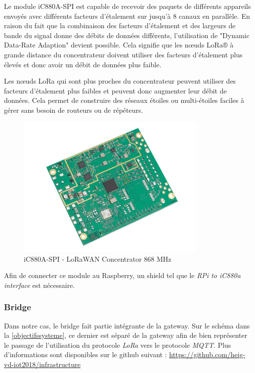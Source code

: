 \documentclass[12pt]{article}
\begin{document}
\newpage
Le module iC880A-SPI est capable de recevoir des paquets de différents appareils envoyés avec différents facteurs d'étalement sur jusqu'à 8 canaux en parallèle. En raison du fait que la combinaison des facteurs d'étalement et des largeurs de bande du signal donne des débits de données différents, l'utilisation de "Dynamic Data-Rate Adaption" devient possible. Cela signifie que les nœuds LoRa® à grande distance du concentrateur doivent utiliser des facteurs d'étalement plus élevés et donc avoir un débit de données plus faible.

Les nœuds LoRa qui sont plus proches du concentrateur peuvent utiliser des facteurs d'étalement plus faibles et peuvent donc augmenter leur débit de données. Cela permet de construire des réseaux étoiles ou multi-étoiles faciles à gérer sans besoin de routeurs ou de répéteurs.

\begin{figure}[!h]
	\centering
	\includegraphics[width=350px]{ic880a-spi}
	\caption{iC880A-SPI - LoRaWAN Concentrator 868 MHz}
	\label{}
\end{figure}

Afin de connecter ce module au Raspberry, un shield tel que le \textit{RPi to iC880a interface} est nécessaire.

\newpage

\subsubsection{Bridge}

Dans notre cas, le bridge fait partie intégrante de la gateway. Sur le schéma dans la \autoref{objectifssysteme}, ce dernier est séparé de la gateway afin de bien représenter le passage de l'utilisation du protocole \textit{LoRa} vers le protocole \textit{MQTT}.
Plus d'informations sont disponibles sur le github suivant : \url{https://github.com/heig-vd-iot2018/infrastructure}
\end{document}

